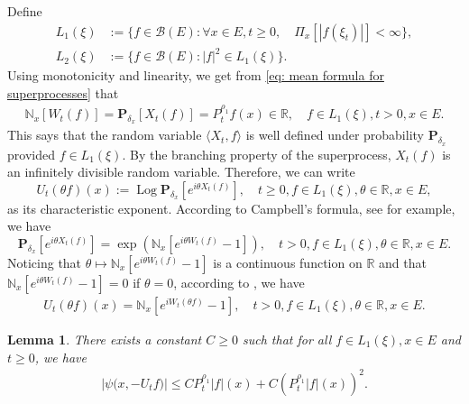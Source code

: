 \documentclass[12pt,a4paper]{amsart}
\theoremstyle{plain}
\newtheorem{lem}[thm]{Lemma}
\theoremstyle{definition}
\numberwithin{equation}{section}
\begin{document}
Define
\begin{align}
  L_1(\xi)
  &:= \{f\in \mathcal B(E): \forall x\in E, t\geq 0, \quad \Pi_x[|f(\xi_t)|]< \infty\}, \\
  L_2(\xi)
  &:= \{f \in \mathcal B(E): |f|^2 \in L_1(\xi)\}.
\end{align}
Using monotonicity and linearity, we get from \eqref{eq: mean formula for superprocesses}  that
\begin{align}
  \mathbb N_x[W_t(f)]
  = \mathbf P_{\delta_x}[X_t(f)]
  = P^{\rho_1}_t f(x) \in \mathbb R,
  \quad f\in L_1(\xi), t > 0,x\in E.
\end{align}
This says that the random variable $\langle X_t, f\rangle$ is well defined under probability $\mathbf P_{\delta_x}$ provided $f\in L_1(\xi)$.
By the branching property of the superprocess, $X_t(f)$ is an infinitely divisible random variable.
Therefore, we can write
\[
  U_t(\theta f)(x)
  := \operatorname{Log} \mathbf P_{\delta_x}[e^{i \theta X_t( f)}],
  \quad t\geq 0, f\in L_1(\xi), \theta \in \mathbb R, x\in E,
\]
as its characteristic exponent.
According to Campbell's formula, see \cite[Theorem 2.7]{Kyprianou2014Fluctuations} for example, we have
\[
  \mathbf P_{\delta_x} [e^{i\theta X_t(f)}]
  = \exp(\mathbb N_x[ e^{i\theta W_t(f)} - 1]),
  \quad t>0, f\in L_1(\xi), \theta \in \mathbb R, x\in E.
\]
Noticing that $\theta \mapsto \mathbb N_x[e^{i\theta W_t(f)} - 1]$ is a continuous function on $\mathbb R$ and that $\mathbb N_x[e^{i\theta W_t(f)} - 1] = 0$ if $\theta = 0$, according to \cite[Lemma 7.6]{Sato2013Levy}, we have
\begin{align}
  \label{eq: N and characteristic exponent}
  U_t(\theta f)(x)
  = \mathbb N_x[e^{i W_t(\theta f)} - 1],
  \quad t>0, f\in L_1(\xi), \theta \in \mathbb R, x\in E.
\end{align}

\begin{lem}
  There exists a constant $C\geq 0$ such that
  for all $f \in L_1(\xi),x\in E$ and $t\geq 0$, we have
  \begin{align}
    \label{eq: upper bound of psi(v)}
    \big|\psi\big(x,-U_tf\big)\big|
    \leq C P^{\rho_1}_t |f|(x) + C (P^{\rho_1}_t |f| (x))^2.
  \end{align}
\end{lem}
\end{document}

